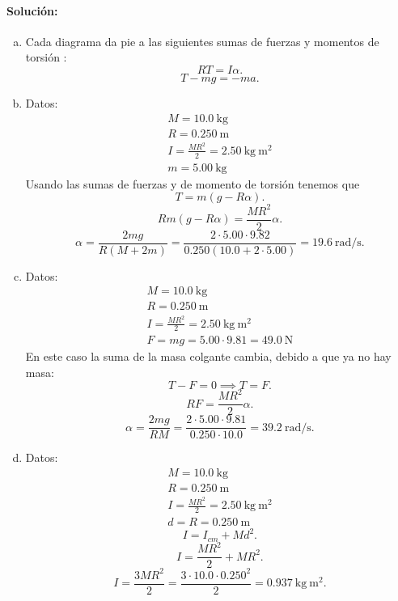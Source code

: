 \documentclass[
  12pt,
]{article}
\newcommand{\unit}[1]{\:\mathrm{#1}}
\begin{document}
\paragraph{Solución:}
\begin{enumerate}[a)]
  \item Cada diagrama da pie a las siguientes sumas de fuerzas y momentos de torsión :
    \[
      R T = I \alpha
    .\] 
    \[
      T - mg = -ma
    .\] 
  \item Datos:
  \[\begin{array}{l}
    M = 10.0 \unit{kg} \\
    R = 0.250 \unit{m}\\
    I = \frac{MR^2}{2} = 2.50 \unit{kg\: m^2} \\
    m = 5.00 \unit{kg}
  \end{array}\]
Usando las sumas de fuerzas y de momento de torsión
tenemos que
\[
  T = m\left( g - R\alpha \right) 
.\] 
\[
  Rm(g - R\alpha) = \frac{MR^2}{2}\alpha
.\] 
\[
  \alpha = \frac{2 mg}{R (M + 2m)}
= \frac{2 \cdot 5.00 \cdot 9.82 }{0.250 (10.0 + 2\cdot 5.00)}
= 19.6 \unit{rad/s}
.\] 
\item Datos:
  \[\begin{array}{l}
    M = 10.0 \unit{kg} \\
    R = 0.250 \unit{m}\\
    I = \frac{MR^2}{2} = 2.50 \unit{kg\: m^2} \\
    F = mg = 5.00 \cdot 9.81 = 49.0 \unit{N}
  \end{array}\]
  En este caso la suma de la masa colgante cambia, debido
  a que ya no hay masa:
  \[
    T- F = 0 \implies T = F
  .\] 
  \[
    R F = \frac{MR^2}{2}\alpha
  .\] 
  \[
    \alpha = \frac{2mg}{RM}
    = \frac{2\cdot 5.00 \cdot 9.81}{0.250 \cdot 10.0}
    = 39.2 \unit{rad /s}
  .\] 
  \item 
Datos:
\[\begin{array}{l}
    M = 10.0 \unit{kg} \\
    R = 0.250 \unit{m}\\
    I = \frac{MR^2}{2} = 2.50 \unit{kg\: m^2} \\
    d = R = 0.250\unit{m}
\end{array}\]
\[
  I = I_{cm} + M d^2
.\] 
\[
  I = \frac{MR^2}{2} + M R^2
.\] 
\[
  I = \frac{3MR^2}{2}
  = \frac{3\cdot 10.0  \cdot 0.250^2}{2}
  = 0.937 \unit{kg\:m^2}
.\] 

\end{enumerate}
\end{document}
